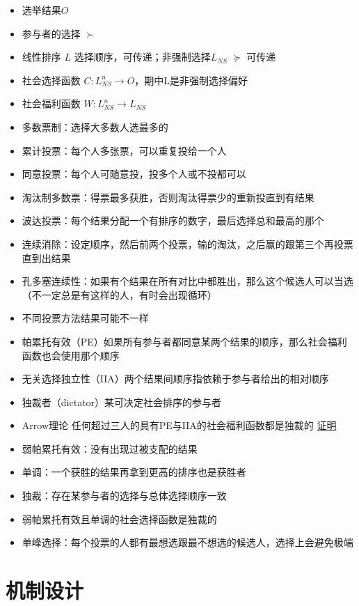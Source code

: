 \documentclass[]{book}
\providecommand{\tightlist}{%
  \setlength{\itemsep}{0pt}\setlength{\parskip}{0pt}}
\begin{document}
\begin{itemize}
\tightlist
\item
  选举结果\(O\)
\item
  参与者的选择 \(\succ\)
\item
  线性排序 \(L\) 选择顺序，可传递；非强制选择\(L_{NS}\) \(\succeq\) 可传递
\item
  社会选择函数 \(C:L_{NS}^n \rightarrow O\)，期中L是非强制选择偏好
\item
  社会福利函数 \(W:L_{NS}^n \rightarrow L_{NS}\)
\item
  多数票制：选择大多数人选最多的
\item
  累计投票：每个人多张票，可以重复投给一个人
\item
  同意投票：每个人可随意投，投多个人或不投都可以
\item
  淘汰制多数票：得票最多获胜，否则淘汰得票少的重新投直到有结果
\item
  波达投票：每个结果分配一个有排序的数字，最后选择总和最高的那个
\item
  连续消除：设定顺序，然后前两个投票，输的淘汰，之后赢的跟第三个再投票直到出结果
\item
  孔多塞连续性：如果有个结果在所有对比中都胜出，那么这个候选人可以当选（不一定总是有这样的人，有时会出现循环）
\item
  不同投票方法结果可能不一样
\item
  帕累托有效（PE）如果所有参与者都同意某两个结果的顺序，那么社会福利函数也会使用那个顺序
\item
  无关选择独立性（IIA）两个结果间顺序指依赖于参与者给出的相对顺序
\item
  独裁者（dictator）某可决定社会排序的参与者
\item
  Arrow理论 任何超过三人的具有PE与IIA的社会福利函数都是独裁的 \href{https://www.douban.com/group/topic/46208753/}{证明}
\item
  弱帕累托有效：没有出现过被支配的结果
\item
  单调：一个获胜的结果再拿到更高的排序也是获胜者
\item
  独裁：存在某参与者的选择与总体选择顺序一致
\item
  弱帕累托有效且单调的社会选择函数是独裁的
\item
  单峰选择：每个投票的人都有最想选跟最不想选的候选人，选择上会避免极端
\end{itemize}

\hypertarget{ux673aux5236ux8bbeux8ba1}{%
\section{机制设计}\label{ux673aux5236ux8bbeux8ba1}}
\end{document}
